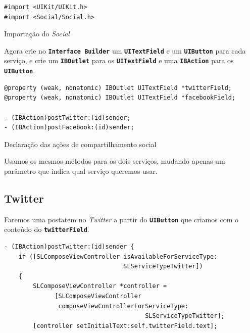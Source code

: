 \documentclass[a4paper,12pt,brazil,doubleside]{book}
\begin{document}
\begin{singlespace}
\begin{listing}[H]
\begin{verbatim}
#import <UIKit/UIKit.h>
#import <Social/Social.h>
\end{verbatim}
\caption{Importação do \emph{Social}}
\end{listing}


Agora crie no \texttt{\textbf{Interface Builder}} um \texttt{\textbf{UITextField}} e um \texttt{\textbf{UIButton}} para cada serviço, e crie um \texttt{\textbf{IBOutlet}} para os \texttt{\textbf{UITextField}} e uma \texttt{\textbf{IBAction}} para os \texttt{\textbf{UIButton}}.

\begin{listing}[H]
\begin{verbatim}
@property (weak, nonatomic) IBOutlet UITextField *twitterField;
@property (weak, nonatomic) IBOutlet UITextField *facebookField;

- (IBAction)postTwitter:(id)sender;
- (IBAction)postFacebook:(id)sender;
\end{verbatim}
\caption{Declaração das ações de compartilhamento social}
\end{listing}


Usamos os mesmos métodos para os dois serviços, mudando apenas um parâmetro que indica qual serviço queremos usar.

\subsection{Twitter}


Faremos uma postatem no \emph{Twitter} a partir do \texttt{\textbf{UIButton}} que criamos com o conteúdo do \texttt{\textbf{twitterField}}. 

\begin{listing}[H]
\begin{verbatim}
- (IBAction)postTwitter:(id)sender {
    if ([SLComposeViewController isAvailableForServiceType:
                                 SLServiceTypeTwitter])
    {
        SLComposeViewController *controller = 
              [SLComposeViewController
               composeViewControllerForServiceType:
                                       SLServiceTypeTwitter];
        [controller setInitialText:self.twitterField.text];
        

\end{verbatim}
\end{listing}
\end{singlespace}
\end{document}
